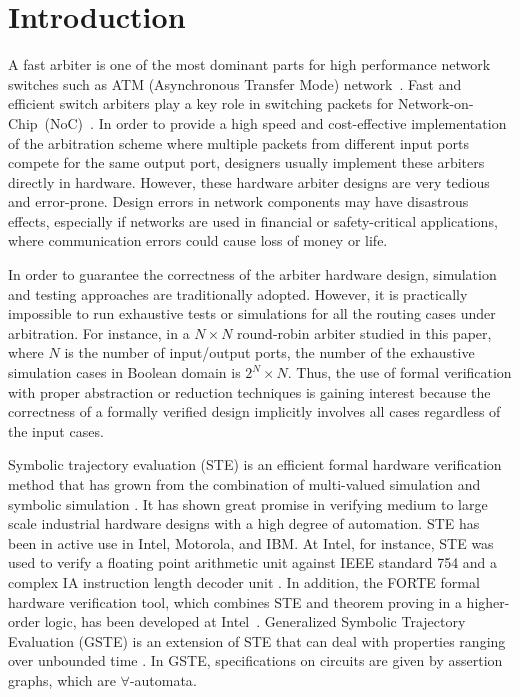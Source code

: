 \documentclass[final]{IEEEtran}
\begin{document}
\section{Introduction}

A fast arbiter is one of the most dominant parts for high
performance network switches such as ATM (Asynchronous Transfer
Mode) network~\cite{GinsburgATM,Paul94}. Fast and efficient
switch arbiters play a key role in switching packets for
Network-on-Chip~(NoC)~\cite{DallyNOC}.
In order to provide a high speed and
cost-effective implementation of the arbitration scheme where
multiple packets from different input ports compete for the same
output port, designers usually implement these arbiters directly in hardware.
However, these hardware arbiter designs are
very tedious and error-prone. Design errors in network components
may have disastrous effects, especially if networks are used in
financial or safety-critical applications, where communication
errors could cause loss of money or life.

In order to guarantee the correctness of the arbiter hardware
design, simulation and testing approaches are traditionally adopted.
However, it is practically impossible to run exhaustive tests or
simulations for all the routing cases under arbitration. For
instance, in a $N\times N$ round-robin arbiter studied in this
paper, where $N$ is the number of input/output ports, the number of
 the exhaustive simulation cases in Boolean domain is $2^N\times N$.
Thus, the use of formal verification with proper abstraction or
reduction techniques is gaining interest because the correctness of
a formally verified design implicitly
involves all cases regardless of the input cases. %


Symbolic trajectory evaluation (STE) is an efficient formal hardware
verification method that has grown from the combination of
multi-valued simulation and symbolic simulation
\cite{CarFmBySymEvaOfPartTraj}. It has shown great promise in
verifying medium to large scale industrial hardware designs with a
high degree of automation. STE has been in active use in Intel,
Motorola, and IBM. At Intel, for instance, STE was used to verify a
floating point arithmetic unit against IEEE standard 754 and a
complex IA
instruction length decoder unit \cite%
{joeraeryFloatPoint,aggardCombineTheoremSTE}. In addition, the FORTE
formal hardware verification tool, which combines STE and theorem
proving in a higher-order logic, has been developed at
Intel~\cite{Forte}.
 Generalized
Symbolic Trajectory Evaluation (GSTE) is an extension of STE that
can deal with properties ranging over unbounded time
\cite{YangS03,yangTech,DBLP:conf/iccad/YangG02}. In GSTE,
specifications on circuits are given by assertion graphs, which are
$\forall$-automata\cite{Manna:1987:SVC:41625.41626}.
\end{document}
